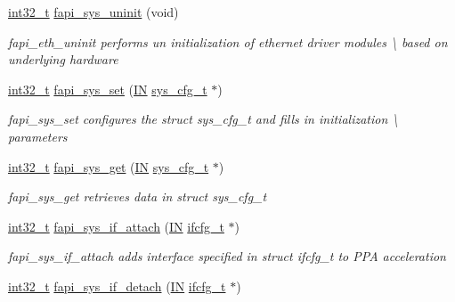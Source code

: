 \begin{DoxyCompactItemize}
\hyperlink{commondefs_8h_a32f2e37ee053cf2ce8ca28d1f74630e5}{int32\-\_\-t} \hyperlink{group__FAPI__SYSTEM_ga02e348eb3557b683a619baa9fe828b5f}{fapi\-\_\-sys\-\_\-uninit} (void)
\begin{DoxyCompactList}\small\item\em fapi\-\_\-eth\-\_\-uninit performs un initialization of ethernet driver modules \textbackslash{} based on underlying hardware \end{DoxyCompactList}\item 
\hyperlink{commondefs_8h_a32f2e37ee053cf2ce8ca28d1f74630e5}{int32\-\_\-t} \hyperlink{group__FAPI__SYSTEM_ga6d9f513e82ece5bd7262e314719f2f2b}{fapi\-\_\-sys\-\_\-set} (\hyperlink{group__LIBHELP_gac2bbd6d630a06a980d9a92ddb9a49928}{I\-N} \hyperlink{group__FAPI__SYSTEM_ga67fc6ffc6cd31f4651e4354a82f894bd}{sys\-\_\-cfg\-\_\-t} $\ast$)
\begin{DoxyCompactList}\small\item\em fapi\-\_\-sys\-\_\-set configures the struct sys\-\_\-cfg\-\_\-t and fills in initialization \textbackslash{} parameters \end{DoxyCompactList}\item 
\hyperlink{commondefs_8h_a32f2e37ee053cf2ce8ca28d1f74630e5}{int32\-\_\-t} \hyperlink{group__FAPI__SYSTEM_ga7d11e2d6c5bc9f725665fad38c891f8b}{fapi\-\_\-sys\-\_\-get} (\hyperlink{group__LIBHELP_gac2bbd6d630a06a980d9a92ddb9a49928}{I\-N} \hyperlink{group__FAPI__SYSTEM_ga67fc6ffc6cd31f4651e4354a82f894bd}{sys\-\_\-cfg\-\_\-t} $\ast$)
\begin{DoxyCompactList}\small\item\em fapi\-\_\-sys\-\_\-get retrieves data in struct sys\-\_\-cfg\-\_\-t \end{DoxyCompactList}\item 
\hyperlink{commondefs_8h_a32f2e37ee053cf2ce8ca28d1f74630e5}{int32\-\_\-t} \hyperlink{group__FAPI__SYSTEM_ga482549373b7c234843ee002dd327227c}{fapi\-\_\-sys\-\_\-if\-\_\-attach} (\hyperlink{group__LIBHELP_gac2bbd6d630a06a980d9a92ddb9a49928}{I\-N} \hyperlink{group__FAPI__SYSTEM_gadd6c781fa3192f45f3f65e2ed2882d6b}{ifcfg\-\_\-t} $\ast$)
\begin{DoxyCompactList}\small\item\em fapi\-\_\-sys\-\_\-if\-\_\-attach adds interface specified in struct ifcfg\-\_\-t to P\-P\-A acceleration \end{DoxyCompactList}\item 
\hyperlink{commondefs_8h_a32f2e37ee053cf2ce8ca28d1f74630e5}{int32\-\_\-t} \hyperlink{group__FAPI__SYSTEM_ga3a6dd562324b7386059fe5e25e87b0af}{fapi\-\_\-sys\-\_\-if\-\_\-detach} (\hyperlink{group__LIBHELP_gac2bbd6d630a06a980d9a92ddb9a49928}{I\-N} \hyperlink{group__FAPI__SYSTEM_gadd6c781fa3192f45f3f65e2ed2882d6b}{ifcfg\-\_\-t} $\ast$)

\end{DoxyCompactItemize}
